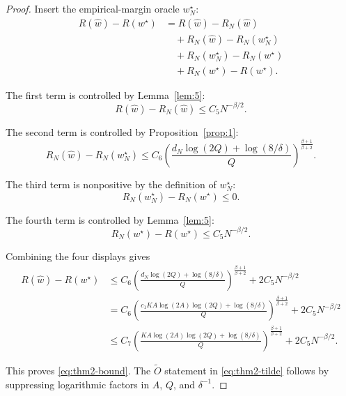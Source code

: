 \documentclass{article} %
\providecommand{\Risk}{R}
\providecommand{\what}{\widehat{w}}
\providecommand{\wstar}{w^{\star}}
\begin{document}
\begin{proof}
Insert the empirical-margin oracle \(w_N^\star\):
\begin{align}
\Risk(\what)-\Risk(\wstar)
&=
\Risk(\what)-\Risk_N(\what)
\label{eq:thm2-proof-a}
\\
&\quad+
\Risk_N(\what)-\Risk_N(w_N^\star)
\label{eq:thm2-proof-b}
\\
&\quad+
\Risk_N(w_N^\star)-\Risk_N(\wstar)
\label{eq:thm2-proof-c}
\\
&\quad+
\Risk_N(\wstar)-\Risk(\wstar).
\label{eq:thm2-proof-d}
\end{align}

The first term is controlled by Lemma~\ref{lem:5}:
\begin{equation}
\label{eq:thm2-proof-first}
\Risk(\what)-\Risk_N(\what)
\le
C_5N^{-\beta/2}.
\end{equation}

The second term is controlled by Proposition~\ref{prop:1}:
\begin{equation}
\label{eq:thm2-proof-second}
\Risk_N(\what)-\Risk_N(w_N^\star)
\le
C_6
\left(
\frac{
d_N\log(2Q)+\log(8/\delta)
}{Q}
\right)^{\frac{\beta+1}{\beta+2}} .
\end{equation}

The third term is nonpositive by the definition of \(w_N^\star\):
\begin{equation}
\label{eq:thm2-proof-third}
\Risk_N(w_N^\star)-\Risk_N(\wstar)
\le
0 .
\end{equation}

The fourth term is controlled by Lemma~\ref{lem:5}:
\begin{equation}
\label{eq:thm2-proof-fourth}
\Risk_N(\wstar)-\Risk(\wstar)
\le
C_5N^{-\beta/2}.
\end{equation}

Combining the four displays gives
\begin{align}
\Risk(\what)-\Risk(\wstar)
&\le
C_6
\left(
\frac{
d_N\log(2Q)+\log(8/\delta)
}{Q}
\right)^{\frac{\beta+1}{\beta+2}}
+
2C_5N^{-\beta/2}
\label{eq:thm2-proof-combine}
\\
&=
C_6
\left(
\frac{
c_1KA\log(2A)\log(2Q)+\log(8/\delta)
}{Q}
\right)^{\frac{\beta+1}{\beta+2}}
+
2C_5N^{-\beta/2}
\label{eq:thm2-proof-substitute}
\\
&\le
C_7
\left(
\frac{
KA\log(2A)\log(2Q)+\log(8/\delta)
}{Q}
\right)^{\frac{\beta+1}{\beta+2}}
+
2C_5N^{-\beta/2}.
\label{eq:thm2-proof-final}
\end{align}

This proves \eqref{eq:thm2-bound}.  The \(\widetilde O\) statement in
\eqref{eq:thm2-tilde} follows by suppressing logarithmic factors in \(A\),
\(Q\), and \(\delta^{-1}\).
\end{proof}
\end{document}
